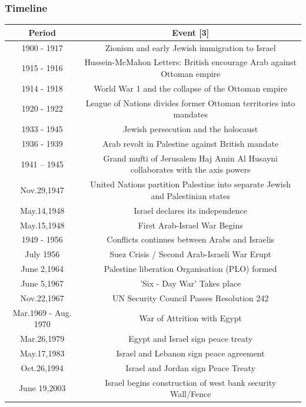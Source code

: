 \documentclass[10pt]{article}
\begin{document}
\subsubsection{Timeline}
\begin{table}[H]
	\centering
	\begin{adjustbox}{width=\textwidth}
	\begin{tabular}{@{}cc@{}}
		\toprule
		Period	& Event [3]\\
		\midrule
    		1900 - 1917	& Zionism and early Jewish immigration to Israel					\\
    		1915 - 1916	& Hussein-McMahon Letters: British encourage Arab against Ottoman empire		\\
		1914 - 1918	& World War 1 and the collapse of the Ottoman empire				\\
		1920 - 1922	& League of Nations divides former Ottoman territories into mandates 		\\
		1933 - 1945	& Jewish persecution and the holocaust						\\
		1936 - 1939	& Arab revolt in Palestine against British mandate					\\
		1941 – 1945	& Grand mufti of Jerusalem Haj Amin Al Husayni collaborates with the axis powers	\\
		Nov.29,1947	& United Nations partition Palestine into separate Jewish and Palestinian states	\\
		May.14,1948	& Israel declares its independence							\\
		May.15,1948	& First Arab-Israel War Begins							\\
		1949 - 1956	& Conflicts continues between Arabs and Israelis					\\
		July 1956	& Suez Crisis / Second Arab-Israeli War Erupt					\\
		June 2,1964	& Palestine liberation Organisation (PLO) formed					\\
		June 5,1967	& 'Six - Day War' Takes place							\\
		Nov.22,1967	& UN Security Council Passes Resolution 242					\\
		Mar.1969 - Aug. 1970	& War of Attrition with Egypt						\\
		Mar.26,1979	& Egypt and Israel sign peace treaty						\\
		May.17,1983	& Israel and Lebanon sign peace agreement						\\
		Oct.26,1994	& Israel and Jordan sign Peace Treaty						\\
		June 19,2003	& Israel begins construction of west bank security Wall/Fence			\\
		\bottomrule
	\end{tabular}
	\end{adjustbox}
\end{table}
\end{document}
